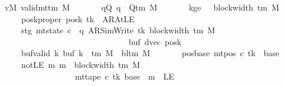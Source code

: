 \begin{isabellebody}
\ \ \ vM{\isacharcolon}{\kern0pt}\ {\isachardoublequoteopen}valid{\isacharunderscore}{\kern0pt}mttm\ M{\isachardoublequoteclose}\isanewline
\ \ \ \ \ \ \ qQ{\isacharcolon}{\kern0pt}\ {\isachardoublequoteopen}q\ {\isasymin}\ Q{\isacharunderscore}{\kern0pt}tm\ M{\isachardoublequoteclose}\isanewline
\ \ \ \ \ \ \ kge{}{\isacharcolon}{\kern0pt}\ {\isachardoublequoteopen}{}\ {\isasymle}\ block{\isacharunderscore}{\kern0pt}width\ {\isacharparenleft}{\kern0pt}{\isasymGamma}{\isacharunderscore}{\kern0pt}tm\ M{\isacharparenright}{\kern0pt}{\isachardoublequoteclose}\isanewline
\ \ \ \ \ \ \ poskproper{\isacharcolon}{\kern0pt}\ {\isachardoublequoteopen}posk\ tk\ {\isasymnoteq}\ AR{\isacharunderscore}{\kern0pt}AtLE{\isachardoublequoteclose}\isanewline
\ \ \ \ \ \ \ stg{\isacharcolon}{\kern0pt}\ {\isachardoublequoteopen}mt{\isacharunderscore}{\kern0pt}state\ c{}\ {\isacharequal}{\kern0pt}\ {\isacharparenleft}{\kern0pt}q{\isacharcomma}{\kern0pt}\ AR{\isacharunderscore}{\kern0pt}SimWrite{\isacharcomma}{\kern0pt}\ tk{\isacharcomma}{\kern0pt}\ block{\isacharunderscore}{\kern0pt}width\ {\isacharparenleft}{\kern0pt}{\isasymGamma}{\isacharunderscore}{\kern0pt}tm\ M{\isacharparenright}{\kern0pt}{\isacharcomma}{\kern0pt}\isanewline
\ \ \ \ \ \ \ \ \ \ \ \ \ \ \ \ \ \ \ \ \ \ \ \ \ \ \ \ \ \ \ \ \ buf{\isacharcomma}{\kern0pt}\ dvec{\isacharcomma}{\kern0pt}\ posk{\isacharparenright}{\kern0pt}{\isachardoublequoteclose}\isanewline
\ \ \ \ \ \ \ buf{\isacharunderscore}{\kern0pt}valid{\isacharcolon}{\kern0pt}\ {\isachardoublequoteopen}{\isasymforall}k{\isachardot}{\kern0pt}\ buf\ k\ {\isasymin}\ {\isasymGamma}{\isacharunderscore}{\kern0pt}tm\ M\ {\isasymunion}\ {\isacharbraceleft}{\kern0pt}bl{\isacharunderscore}{\kern0pt}tm\ M{\isacharbraceright}{\kern0pt}{\isachardoublequoteclose}\isanewline
\ \ \ \ \ \ \ pos{\isacharunderscore}{\kern0pt}base{\isacharcolon}{\kern0pt}\ {\isachardoublequoteopen}mt{\isacharunderscore}{\kern0pt}pos\ c{}\ tk\ {\isacharequal}{\kern0pt}\ base{\isachardoublequoteclose}\isanewline
\ \ \ \ \ \ \ notLE{\isacharcolon}{\kern0pt}\ {\isachardoublequoteopen}{\isasymAnd}m{\isachardot}{\kern0pt}\ m\ {\isacharless}{\kern0pt}\ block{\isacharunderscore}{\kern0pt}width\ {\isacharparenleft}{\kern0pt}{\isasymGamma}{\isacharunderscore}{\kern0pt}tm\ M{\isacharparenright}{\kern0pt}\isanewline
\ \ \ \ \ \ \ \ \ \ \ \ \ \ \ \ \ \ \ {\isasymLongrightarrow}\ mt{\isacharunderscore}{\kern0pt}tape\ c{}\ tk\ {\isacharparenleft}{\kern0pt}base\ {\isacharplus}{\kern0pt}\ m{\isacharparenright}{\kern0pt}\ {\isasymnoteq}\ LE{}{\isachardoublequoteclose}\isanewline

\end{isabellebody}
